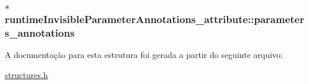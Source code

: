 \subsubsection[{\texorpdfstring{parameters\+\_\+annotations}{parameters_annotations}}]{$\ast$ runtime\+Invisible\+Parameter\+Annotations\+\_\+attribute\+::parameters\+\_\+annotations}\hypertarget{structruntimeInvisibleParameterAnnotations__attribute_a5e720df1952e818a4b5973aec115eade}{}\label{structruntimeInvisibleParameterAnnotations__attribute_a5e720df1952e818a4b5973aec115eade}


A documentação para esta estrutura foi gerada a partir do seguinte arquivo\+:\begin{DoxyCompactItemize}
\item 
\hyperlink{structures_8h}{structures.\+h}\end{DoxyCompactItemize}
